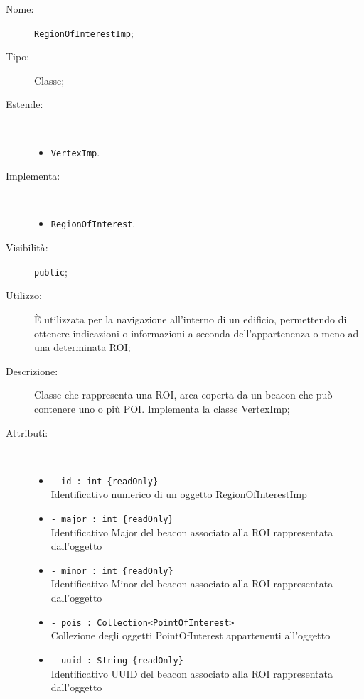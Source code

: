 \documentclass[../DefinizioneDiProdotto.tex]{subfiles}
\begin{document}
    \begin{description}
\item[Nome:] \texttt{RegionOfInterestImp};
\item[Tipo:] Classe;
\item[Estende:] \
\begin{itemize}
\item \texttt{VertexImp}.
\end{itemize}
\item[Implementa:] \
\begin{itemize}
\item \texttt{RegionOfInterest}.

\end{itemize}
\item[Visibilità:] \texttt{public};
\item[Utilizzo:] È utilizzata per la navigazione all'interno di un edificio, permettendo di ottenere indicazioni o informazioni a seconda dell'appartenenza o meno ad una determinata ROI;
\item[Descrizione:] Classe che rappresenta una ROI, area coperta da un beacon che può contenere uno o più POI. Implementa la classe VertexImp;
\item[Attributi:] \
\begin{itemize}
\item \texttt{- id  : int \{readOnly\}}\\
Identificativo numerico di un oggetto RegionOfInterestImp

\item \texttt{- major : int \{readOnly\}}\\
Identificativo Major del beacon associato alla ROI rappresentata dall'oggetto

\item \texttt{- minor : int \{readOnly\}}\\
Identificativo Minor del beacon associato alla ROI rappresentata dall'oggetto

\item \texttt{- pois : Collection<PointOfInterest>}\\
Collezione degli oggetti PointOfInterest appartenenti all'oggetto

\item \texttt{- uuid : String \{readOnly\}}\\
Identificativo UUID del beacon associato alla ROI rappresentata dall'oggetto


\end{itemize}
\end{description}
\end{document}
